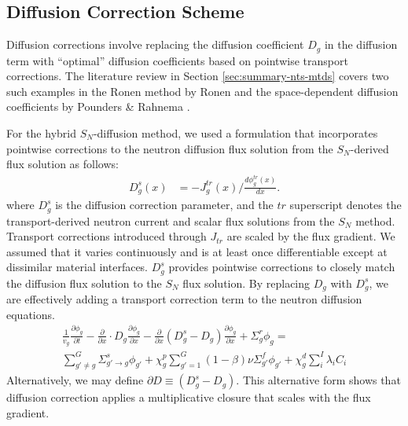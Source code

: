 \subsection{Diffusion Correction Scheme} \label{sec:diffusion-correction}

Diffusion corrections involve replacing the diffusion coefficient $D_g$ in the
diffusion term with ``optimal'' diffusion coefficients based on
pointwise transport corrections. The literature review in Section \ref{sec:summary-nts-mtds} covers
two such
examples in the Ronen method by Ronen \cite{ronen_accurate_2004} and the space-dependent diffusion
coefficients by Pounders \& Rahnema \cite{pounders_diffusion_2009}.

For the hybrid $S_N$-diffusion method, we used a formulation that incorporates pointwise
corrections to the neutron diffusion flux solution from the $S_N$-derived flux solution as follows:
%
\begin{align}
  D^s_g(x) &= -J^{tr}_g(x)\bigg/\frac{d\phi^{tr}_g(x)}{dx}. \label{eq:svdc}
\end{align}
%
where $D^s_g$ is the diffusion correction parameter, and the $tr$ superscript denotes the
transport-derived neutron
current and scalar flux solutions from the $S_N$ method. Transport corrections introduced through
$J_{tr}$ are scaled by the flux gradient. We assumed that it varies continuously and is
at least once differentiable except at dissimilar material interfaces. $D^s_g$ provides
pointwise corrections to closely match the diffusion flux solution to the $S_N$ flux solution.
By replacing $D_g$ with $D^s_g$, we are effectively adding a transport correction term to the
neutron diffusion equations.
%
\begin{multline}
  \frac{1}{v_g} \frac{\partial \phi_g}{\partial t} - \frac{\partial}{\partial x} \cdot D_g
  \frac{\partial \phi_g}{\partial x} 
  -\frac{\partial}{\partial x}(D^s_g-D_g)\frac{\partial\phi_g}{\partial x}
  + \Sigma^r_g \phi_g = \\
  \sum^G_{g' \neq g} \Sigma^s_{g' \rightarrow g} \phi_{g'}
  + \chi^p_g \sum^G_{g'=1} \left( 1-\beta \right) \nu \Sigma^f_{g'}
  \phi_{g'} + \chi^d_g \sum^I_i \lambda_i C_i \label{eq:neutron-diffusion-correction} %
\end{multline}
Alternatively, we may define
$\partial D\equiv\left(D^s_g-D_g\right)$. This alternative form shows that diffusion
correction applies a multiplicative closure that scales with the flux gradient.

